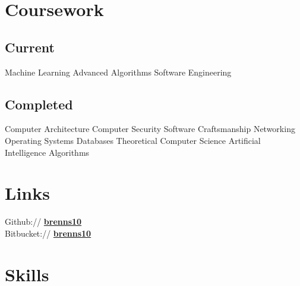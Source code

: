 \documentclass[letterpaper]{deedy-resume} %
\newcommand{\bul}{\textbullet{}}
\begin{document}
\begin{minipage}[t]{0.33\textwidth}
\sectionspace %


\section{Coursework}

\subsection{Current}

Machine Learning \bul
Advanced Algorithms \bul
Software Engineering

\sectionspace %


\subsection{Completed}

Computer Architecture \bul
Computer Security \bul
Software Craftsmanship \bul
Networking \bul
Operating Systems \bul
Databases \bul
Theoretical Computer Science \bul
Artificial Intelligence \bul
Algorithms


\sectionspace %


\section{Links}

Github:// \href{https://github.com/brenns10}{\bf brenns10} \\
Bitbucket:// \href{https://bitbucket.org/brenns10}{\bf brenns10} \\

\sectionspace %


\section{Skills}


\end{minipage}
\end{document}
